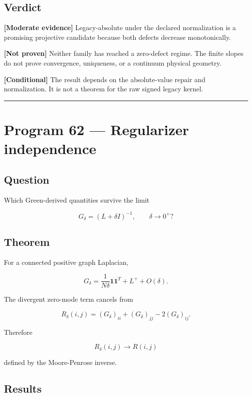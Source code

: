 \documentclass[11pt,a4paper,openany]{report}
\newcommand{\statusModerate}{\textcolor{finviolet}{[Moderate evidence]}}
\newcommand{\statusConditional}{\textcolor{finorange}{[Conditional]}}
\begin{document}
\section{Verdict}

\textbf{\statusModerate{}} Legacy-absolute under the declared normalization is a promising projective candidate because both defects decrease monotonically.

\textbf{[Not proven]} Neither family has reached a zero-defect regime. The finite slopes do not prove convergence, uniqueness, or a continuum physical geometry.

\textbf{\statusConditional{}} The result depends on the absolute-value repair and normalization. It is not a theorem for the raw signed legacy kernel.

\par\medskip\hrule\medskip

\chapter{Program 62 — Regularizer independence}

\section{Question}

Which Green-derived quantities survive the limit

\[
G_\delta=(L+\delta I)^{-1},
\qquad
\delta\to0^+?
\]

\section{Theorem}

For a connected positive graph Laplacian,

\[
G_\delta
=
\frac{1}{N\delta}\mathbf1\mathbf1^T
+
L^+
+
O(\delta).
\]

The divergent zero-mode term cancels from

\[
R_\delta(i,j)
=
(G_\delta)_{ii}
+
(G_\delta)_{jj}
-
2(G_\delta)_{ij}.
\]

Therefore

\[
R_\delta(i,j)\longrightarrow R(i,j)
\]

defined by the Moore-Penrose inverse.

\section{Results}
\end{document}
